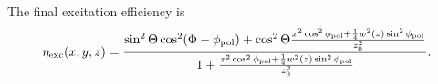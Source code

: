 \documentclass[11pt]{article}
\begin{document}
The final excitation efficiency is
\begin{align*}
\eta_{\text{exc}}(x,y,z) = \frac{\sin^2\Theta\cos^2(\Phi - \phi_{\text{\text{pol}}}) + \cos^2\Theta\frac{x^2\cos^2\phi_{\text{pol}} + \frac{1}{4}w^2(z)\sin^2\phi_{\text{pol}}}{z_0^2}}{1 + \frac{x^2\cos^2\phi_{\text{pol}} + \frac{1}{4}w^2(z)\sin^2\phi_{\text{pol}}}{z^2_0}}.
\end{align*}
\end{document}
